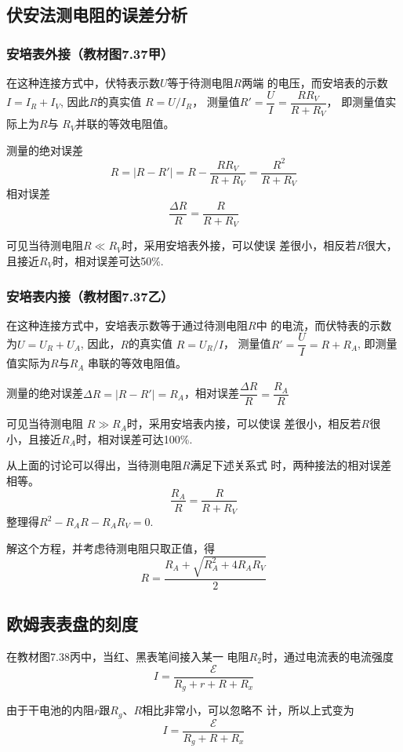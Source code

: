 \subsection{伏安法测电阻的误差分析}
\subsubsection{安培表外接（教材图7.37甲）}
在这种连接方式中，伏特表示数$U$等于待测电阻$R$两端
的电压，而安培表的示数$I=I_R+I_V$, 因此$R$的真实值
$R=U/I_R$，
测量值$R'=\dfrac{U}{I}=\dfrac{RR_V}{R+R_V}$，
即测量值实际上为$R$与
$R_V$并联的等效电阻值。

测量的绝对误差
\[R=|R-R'|=R-\dfrac{RR_V}{R+R_V}=\dfrac{R^2}{R+R_V}\]
相对误差
\[\frac{\Delta R}{R}=\frac{R}{R+R_V}\]

可见当待测电阻$R\ll R_V$时，采用安培表外接，可以使误
差很小，相反若$R$很大，且接近$R_V$时，相对误差可达50\%.

\subsubsection{安培表内接（教材图7.37乙）}
在这种连接方式中，安培表示数等于通过待测电阻$R$中
的电流，而伏特表的示数为$U=U_R+U_A$, 因此，$R$的真实值
$R=U_R/I$，
测量值$R'=\dfrac{U}{I}=R+R_A$, 即测量值实际为$R$与$R_A$
串联的等效电阻值。

测量的绝对误差$\Delta R=|R-R'|=R_A$，相对误差$\dfrac{\Delta R}{R}=\dfrac{R_A}{R}$

可见当待测电阻 $R\gg R_A$时，采用安培表内接，可以使误
差很小，相反若$R$很小，且接近$R_A$时，相对误差可达100\%.

从上面的讨论可以得出，当待测电阻$R$满足下述关系式
时，两种接法的相对误差相等。
\[\frac{R_A}{R}=\frac{R}{R+R_V}\]
整理得$R^2-R_AR-R_AR_V=0$.

解这个方程，并考虑待测电阻只取正值，得
\[R=\frac{R_A+\sqrt{R^2_A+4R_AR_V}}{2}\]

\subsection{欧姆表表盘的刻度}

在教材图7.38丙中，当红、黑表笔间接入某一
电阻$R_2$时，通过电流表的电流强度
\[I=\frac{\mathcal{E}}{R_g+r+R+R_x}\]

由于干电池的内阻$r$跟$R_g$、$R$相比非常小，可以忽略不
计，所以上式变为
\begin{equation}
    I=\frac{\mathcal{E}}{R_g+R+R_x}
\end{equation}

